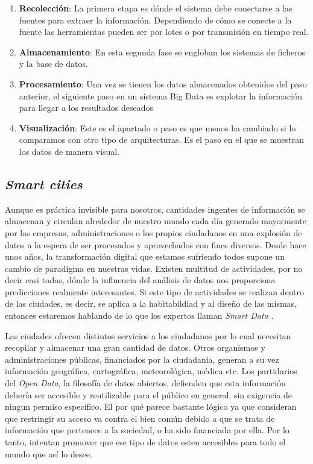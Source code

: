 \begin{enumerate}
	\item \textbf{Recolección}: La primera etapa es dónde el sistema debe conectarse a las fuentes para extraer la información. Dependiendo de cómo se conecte a la fuente las herramientas pueden ser por lotes o por transmisión en tiempo real.
	\item \textbf{Almacenamiento}: En esta segunda fase se engloban los sistemas de ficheros y la base de datos.
	\item \textbf{Procesamiento}: Una vez se tienen los datos almacenados obtenidos del paso anterior, el siguiente paso en un sistema Big Data es explotar la
	información para llegar a los resultados deseados
	
	\item \textbf{Visualización}: Este es el apartado o paso es que menos ha cambiado si lo comparamos con otro tipo de arquitecturas. Es el paso en el que se muestran los datos de manera visual.
\end{enumerate}



\subsection{\emph{Smart cities}}

Aunque es práctica invisible para nosotros, cantidades ingentes de información se almacenan y circulan alrededor de nuestro mundo cada día generado mayormente por las empresas, administraciones o los propios ciudadanos en una explosión de datos a la espera de ser procesados y aprovechados con fines diversos. Desde hace unos años, la transformación digital que estamos sufriendo todos supone un cambio de paradigma en nuestras vidas. Existen multitud de actividades, por no decir casi todas, dónde la influencia del análisis de datos nos proporciona predicciones realmente interesantes. Si este tipo de actividades se realizan dentro de las ciudades, es decir, se aplica a la habitabildiad y al diseño de las mismas, entonces estaremos hablando de lo que los expertos llaman \emph{Smart Data} \cite{foote_big_2018}.

Las ciudades ofrecen distintos servicios a los ciudadanos por lo cual necesitan recopilar y almacenar una gran cantidad de datos. Otros organismos y administraciones públicas, financiados por la ciudadanía, generan a su vez información geográfica, cartográfica, meteorológica, médica etc. Los partidarios del \emph{Open Data}, la filosofía de datos abiertos, defienden que esta información debería ser accesible y reutilizable para el público en general, sin exigencia de ningun permiso específico. El por qué parece bastante lógico ya que consideran que restringir su acceso va contra el bien común debido a que se trata de información que pertenece a la sociedad, o ha sido financiada por ella. Por lo tanto, intentan promover que ese tipo de datos esten accesibles para todo el mundo que así lo desee. 

